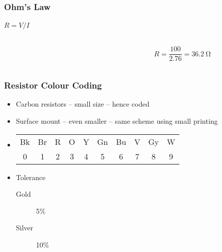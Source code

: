\documentclass[svgnames,x11names]{beamer}
\begin{document}
\begin{frame}
  \frametitle{Ohm's Law}
  \framesubtitle{$R = V/I$}
  \begin{columns}[onlytextwidth]
    \begin{column}{0.33\textwidth}
    \end{column}
    \begin{column}{0.66\textwidth}
      \[
      R = \frac{100}{2.76} = \SI{36.2}{\ohm}
      \]
    \end{column}
  \end{columns}  
\end{frame}

\begin{frame}
  \frametitle{Resistor Colour Coding}
  \begin{itemize}
  \item Carbon resistors -- small size -- hence coded
  \item Surface mount -- even smaller -- same scheme using small printing
\item
  \begin{tabular}{cccccccccc}
    Bk&Br&R&O&Y&Gn&Bu&V&Gy&W\\
    0&1&2&3&4&5&6&7&8&9
  \end{tabular}
\item Tolerance
  \begin{description}
  \item[Gold] 5\%
  \item[Silver] 10\%
  \end{description}
\end{itemize}
\end{frame}
\end{document}
